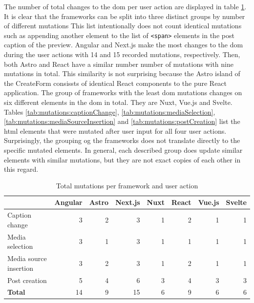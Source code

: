 \documentclass[a4paper, 10pt]{article}
\begin{document}
The number of total changes to the \acrshort{dom} per user action are displayed in table \ref{tab:mutations:total}.
It is clear that the frameworks can be split into three distinct groups by number of different mutations
This list intentionally does not count identical mutations such as appending another element to the list of \verb|<span>| elements in the post caption of the preview.
Angular and Next.js make the most changes to the \acrshort{dom} during the user actions with 14 and 15 recorded mutations, respectively.
Then, both Astro and React have a similar number number of mutations with nine mutations in total.
This similarity is not surprising because the Astro island of the CreateForm consissts of identical React components to the pure React application.
The group of frameworks with the least \acrshort{dom} mutations changes on six different elements in the \acrshort{dom} in total.
They are Nuxt, Vue.js and Svelte.
Tables \ref{tab:mutations:captionChange}, \ref{tab:mutations:mediaSelection}, \ref{tab:mutations:mediaSourceInsertion} and \ref{tab:mutations:postCreation} list the \acrshort{html} elements that were mutated after user input for all four user actions.
Surprisingly, the grouping og the frameworks does not translate directly to the specific mutated elements.
In general, each described group does update similar elements with similar mutations, but they are not exact copies of each other in this regard.

\begin{table}[!ht]
  \centering
  \begin{adjustbox}{angle=90}
    \begin{tabular}{|l|r|r|r|r|r|r|r|}
      \hline
      ~                       & \textbf{Angular}  & \textbf{Astro}  & \textbf{Next.js}  & \textbf{Nuxt} & \textbf{React}  & \textbf{Vue.js} & \textbf{Svelte} \\ \hline
      Caption change          & 3                 & 2               & 3                 & 1             & 2               & 1               & 1               \\ \hline
      Media selection         & 3                 & 1               & 3                 & 1             & 1               & 1               & 1               \\ \hline
      Media source insertion  & 3                 & 2               & 3                 & 1             & 2               & 1               & 1               \\ \hline
      Post creation           & 5                 & 4               & 6                 & 3             & 4               & 3               & 3               \\ \hline\hline
      \textbf{Total}          & 14                & 9               & 15                & 6             & 9               & 6               & 6               \\ \hline
    \end{tabular}
  \end{adjustbox}
  \caption{Total mutations per framework and user action}
  \label{tab:mutations:total}
\end{table}
\end{document}
